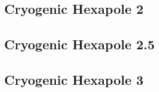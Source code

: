 \subsection{Cryogenic Hexapole 2}

\subsection{Cryogenic Hexapole 2.5}

\subsection{Cryogenic Hexapole 3}
















\ifx\justbeingincluded\undefined

\fi